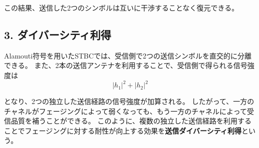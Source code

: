 \documentclass[uplatex,dvipdfmx,11pt,a4paper]{bxjsarticle}
\begin{document}
この結果、送信した2つのシンボルは互いに干渉することなく復元できる。

\subsection*{3. ダイバーシティ利得}

Alamouti符号を用いたSTBCでは、受信側で2つの送信シンボルを直交的に分離できる。
また、2本の送信アンテナを利用することで、受信側で得られる信号強度は
\[
\boxed{\lvert h_1\rvert^2 + \lvert h_2\rvert^2}
\]

となり、2つの独立した送信経路の信号強度が加算される。
したがって、一方のチャネルがフェージングによって弱くなっても、もう一方のチャネルによって受信品質を補うことができる。
このように、複数の独立した送信経路を利用することでフェージングに対する耐性が向上する効果を\textbf{送信ダイバーシティ利得}という。
\end{document}
